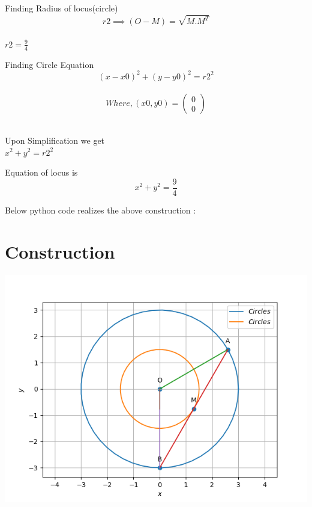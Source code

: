 \documentclass[10pt,a4paper]{report}
\newcommand{\myvec}[1]{\ensuremath{\begin{pmatrix}#1\end{pmatrix}}}
\begin{document}
\begin{multicols}{2}
\raggedright Finding Radius of locus(circle)
 \begin{equation} r2 \implies (O-M)=\sqrt{M.M^T} 
 \end{equation}\\ 
 \centering $r2=\frac{9}{4}$ \\
 \raggedright Finding Circle Equation
   \\
   \begin{equation} 
     (x-x0)^2+(y-y0)^2=r2^2
   \end{equation}\\ 
   \begin{equation} 
   Where, (x0,y0)=\myvec{0\\0} 
  \end{equation} \\
 \raggedright Upon Simplification we get \\
   \centering $x^2+y^2= r2^2$ \\
 \raggedright Equation of locus is
   \begin{equation}
    x^2+y^2= \frac{9}{4}
   \end{equation}
   
 \begin{center}
Below python code realizes the above construction : 
\end{center}
 \section{Construction}
   \begin{center}
  \includegraphics[scale=0.5]{Fig.png}
    \end{center}
\vspace{3cm}
\end{multicols}
\end{document}

